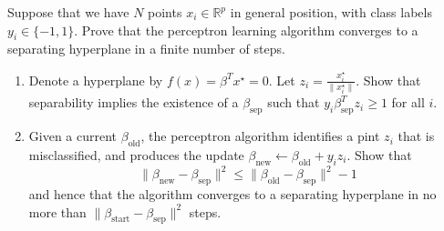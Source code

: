\begin{exer}
    Suppose that we have $N$ points $x_i \in \mathbb{R}^p$ in general position, with class labels $y_i \in \{-1, 1 \}$.  Prove that the perceptron learning algorithm converges to a separating hyperplane in a finite number of steps.  
    \begin{enumerate}
        \item Denote a hyperplane by $f(x) = \beta^T x^\star = 0$.  Let $z_i = \frac{x_i^\star}{\| x_i^\star \|}$.  Show that separability implies the existence of a $\beta_{\text{sep}}$ such that $y_i \beta_{\text{sep}}^T z_i \geq 1$ for all $i$.  
        \item Given a current $\beta_{\text{old}}$, the perceptron algorithm identifies a pint $z_i$ that is misclassified, and produces the update $\beta_{\text{new}} \leftarrow \beta_{\text{old}} + y_i z_i$.  Show that 
            \[
                \| \beta_{\text{new}} - \beta_{\text{sep}} \|^2 \leq \| \beta_{\text{old}} - \beta_{\text{sep}} \|^2 - 1
            \] and hence that the algorithm converges to a separating hyperplane in no more than $\| \beta_{\text{start}} - \beta_{\text{sep}} \|^2$ steps.
    \end{enumerate}
\end{exer}

